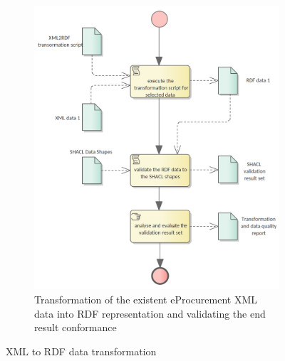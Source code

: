 \begin{figure}
\begin{subfigure}[b]{.48\textwidth}
			\includegraphics[width=1.05\linewidth]{../img/xmlDataTransformation.png}
			\caption{Transformation of the existent eProcurement XML data into RDF representation and validating the end result conformance}
			\label{fig:sub2}
		\end{subfigure}
		\caption{XML to RDF data transformation}
		\label{fig:test}
	\end{figure}

	
	